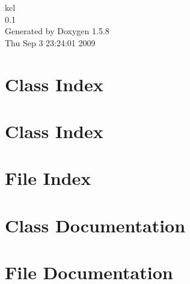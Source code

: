 \documentclass[a4paper]{book}
\begin{document}
\begin{titlepage}
\vspace*{7cm}
\begin{center}
{\Large kcl \\[1ex]\large 0.1 }\\
\vspace*{1cm}
{\large Generated by Doxygen 1.5.8}\\
\vspace*{0.5cm}
{\small Thu Sep 3 23:24:01 2009}\\
\end{center}
\end{titlepage}
\clearemptydoublepage
{}
\tableofcontents
\clearemptydoublepage
{}
\chapter{Class Index}

\chapter{Class Index}

\chapter{File Index}

\chapter{Class Documentation}












\chapter{File Documentation}
















\printindex
\end{document}
